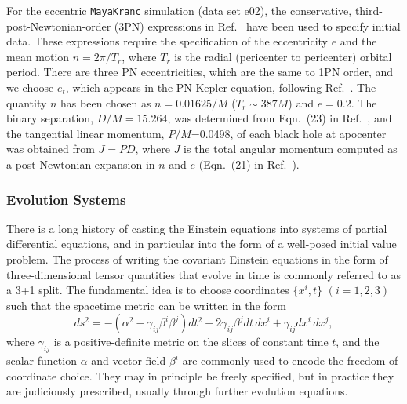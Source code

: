 For the eccentric {\tt MayaKranc} simulation (data set e02), the
conservative, third-post-Newtonian-order (3PN) expressions in
Ref.~\cite{Konigsdorffer:2006zt} have been used to specify initial
data.  These expressions require the specification of the eccentricity
$e$ and the mean motion $n = 2\pi/T_r$, where $T_r$ is the radial
(pericenter to pericenter) orbital period.  There are three PN
eccentricities, which are the same to 1PN order, and we choose $e_t$,
which appears in the PN Kepler equation, following
Ref.~\cite{Konigsdorffer:2006zt}.  The quantity $n$ has been chosen as
$n = 0.01625/M$ ($T_r \sim 387 M$) and $e=0.2$.  The binary
separation, $D/M=15.264$, was determined from Eqn.~(23) in
Ref.~\cite{Konigsdorffer:2006zt}, and the tangential linear momentum,
$P/M$=0.0498, of each black hole at apocenter was obtained from $J = P
D$, where $J$ is the total angular momentum computed as a
post-Newtonian expansion in $n$ and $e$ (Eqn.~(21) in
Ref.~\cite{Konigsdorffer:2006zt}).




\subsubsection{Evolution Systems}
\label{ssec:ev}

There is a long history of casting the Einstein equations into systems
of partial differential equations, and in 
particular into the form of a well-posed initial value problem. The
process of writing the covariant Einstein equations 
in the form of three-dimensional tensor quantities that evolve in time
is commonly referred to as a 3+1 split. The fundamental idea
is to choose coordinates $\{x^{i},t\}$ $(i=1,2,3)$ such 
that the spacetime metric can be written in the form
\begin{equation}
\label{3+1_split}
ds^2 = -(\alpha^{2}-\gamma_{ij}\beta^{i}\beta^{j})dt^{2}
   + 2 \gamma_{ij}\beta^{j}dt\,dx^{i}
   + \gamma_{ij}dx^{i}\,dx^{j}, 
\end{equation}
where $\gamma_{ij}$ is a positive-definite metric on the slices of
constant time $t$, and the scalar function $\alpha$ and  
vector field $\beta^i$ are commonly used to encode the freedom of
coordinate choice. They may in principle be freely specified, but in
practice they are judiciously prescribed, usually through further evolution equations.

